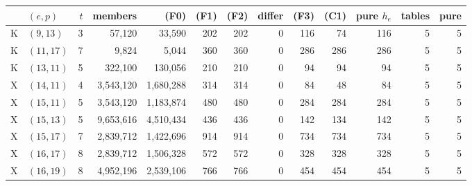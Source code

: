 \begin{tabular}{@{}llrrrrrrrrrrr@{}}
\toprule
 & $(e,p)$ & $t$ & members & (F0) & (F1) & (F2) & differ & (F3) & (C1) & pure $h_e$ & tables & pure\\
\midrule
K & $(9,13)$ & 3 & 57{,}120 & 33{,}590 & 202 & 202 & 0 & 116 & 74 & 116 & 5 & 5\\
K & $(11,17)$ & 7 & 9{,}824 & 5{,}044 & 360 & 360 & 0 & 286 & 286 & 286 & 5 & 5\\
K & $(13,11)$ & 5 & 322{,}100 & 130{,}056 & 210 & 210 & 0 & 94 & 94 & 94 & 5 & 5\\
X & $(14,11)$ & 4 & 3{,}543{,}120 & 1{,}680{,}288 & 314 & 314 & 0 & 84 & 48 & 84 & 5 & 5\\
X & $(15,11)$ & 5 & 3{,}543{,}120 & 1{,}183{,}874 & 480 & 480 & 0 & 284 & 284 & 284 & 5 & 5\\
X & $(15,13)$ & 5 & 9{,}653{,}616 & 4{,}510{,}434 & 436 & 436 & 0 & 142 & 134 & 142 & 5 & 5\\
X & $(15,17)$ & 7 & 2{,}839{,}712 & 1{,}422{,}696 & 914 & 914 & 0 & 734 & 734 & 734 & 5 & 5\\
X & $(16,17)$ & 8 & 2{,}839{,}712 & 1{,}506{,}328 & 572 & 572 & 0 & 328 & 328 & 328 & 5 & 5\\
X & $(16,19)$ & 8 & 4{,}952{,}196 & 2{,}539{,}106 & 766 & 766 & 0 & 454 & 454 & 454 & 5 & 5\\
\bottomrule
\end{tabular}
